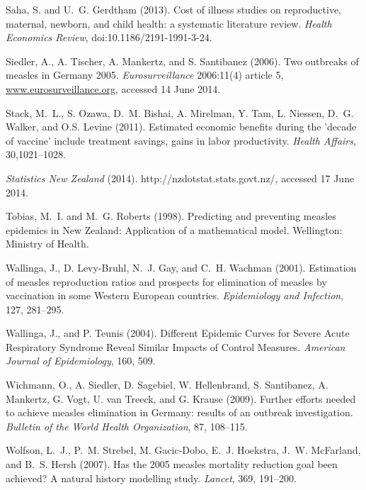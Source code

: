 \documentclass{article}
\begin{document}
\begin{itemize}
\begin{thebibliography}{}
Saha, S. and U.~G. Gerdtham (2013).
\newblock Cost of illness studies on reproductive, maternal, newborn, and child health: a systematic literature review.
\newblock \emph{Health Economics Review}, doi:10.1186/2191-1991-3-24.

Siedler, A., A. Tischer, A. Mankertz, and S. Santibanez (2006).
\newblock Two outbreaks of measles in Germany 2005.
\newblock \emph{Eurosurveillance} 2006:11(4) article 5, \href{http://www.eurosurveillance.org/ViewArticle.aspx?ArticleId=615}{www.eurosurveillance.org}, accessed 14 June 2014.

Stack, M.~L., S. Ozawa, D.~M. Bishai, A. Mirelman, Y. Tam, L. Niessen, D.~G. Walker, and O.S. Levine (2011).
\newblock Estimated economic benefits during the 'decade of vaccine' include treatment savings, gains in labor productivity.
\newblock \emph{Health Affairs}, 30,1021--1028.

\newblock \emph{Statistics New Zealand} (2014).
http://nzdotstat.stats.govt.nz/, accessed 17 June 2014.

Tobias, M.~I. and M.~G. Roberts (1998).
\newblock Predicting and preventing measles epidemics in New Zealand: Application of a mathematical model.
\newblock Wellington: Ministry of Health.

Wallinga, J., D. Levy-Bruhl, N.~J. Gay, and C.~H. Wachman (2001).
\newblock Estimation of measles reproduction ratios and prospects for elimination of measles by vaccination in some Western European countries.
\newblock \emph{Epidemiology and Infection}, 127, 281--295.

Wallinga, J., and P. Teunis (2004).
\newblock Different Epidemic Curves for Severe Acute Respiratory Syndrome Reveal Similar Impacts of Control Measures.
\newblock \emph{American Journal of Epidemiology}, 160, 509.

Wichmann, O., A. Siedler, D. Sagebiel, W. Hellenbrand, S. Santibanez, A. Mankertz, G. Vogt, U. van Treeck, and G. Krause (2009).
\newblock Further efforts needed to achieve measles elimination in Germany: results of an outbreak investigation.
\newblock \emph{Bulletin of the World Health Organization}, 87, 108--115.

Wolfson, L.~J., P.~M. Strebel, M. Gacic-Dobo, E.~J. Hoekstra, J.~W. McFarland, and B.~S. Hersh (2007).
\newblock Has the 2005 measles mortality reduction goal been achieved? A natural history modelling study.
\newblock \emph{Lancet}, 369, 191--200.


\end{thebibliography}
\end{itemize}
\end{document}
